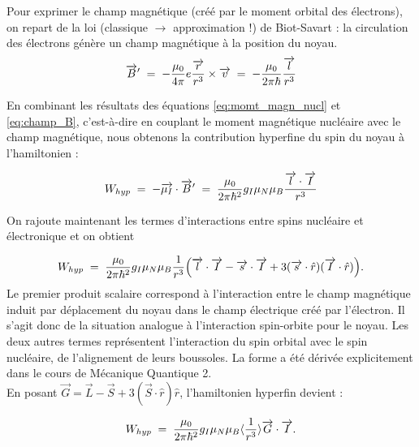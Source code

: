 Pour exprimer le champ magnétique (créé par le moment orbital des électrons), on repart de la loi (classique $\rightarrow$ approximation !) de Biot-Savart : la circulation des électrons génère un champ magnétique à la position du noyau.
\begin{equation}
    \overrightarrow{B}' \; = \;
    -\dfrac{\mu_0}{4\pi}e\dfrac{\overrightarrow{r}}{r^3}\times \overrightarrow{v} \; = \;
    -\dfrac{\mu_0}{2\pi\hbar}\dfrac{\overrightarrow{l}}{r^3}
    \label{eq:champ_B}
\end{equation}

En combinant les résultats des équations \eqref{eq:momt_magn_nucl} et \eqref{eq:champ_B}, c'est-à-dire en couplant le moment magnétique nucléaire avec le champ magnétique, nous obtenons la contribution hyperfine du spin du noyau à l'hamiltonien :

\begin{equation*}
    W_{hyp} \; = \; 
    - \overrightarrow{\mu_I} \cdot \overrightarrow{B}'
    \; = \;
    \dfrac{\mu_0}{2\pi\hbar^2} g_I \mu_N \mu_B \dfrac{\overrightarrow{l}\cdot\overrightarrow{I}}{r^3}
\end{equation*}

 On rajoute maintenant les termes d'interactions entre spins nucléaire et électronique et on obtient

\begin{equation}
    W_{hyp} \; = \;  \dfrac{\mu_0}{2\pi\hbar^2}g_I\mu_N\mu_B\dfrac{1}{r^3}\Big( \overrightarrow{l}\cdot\overrightarrow{I}-\overrightarrow{s}\cdot\overrightarrow{I} + 3(\overrightarrow{s}\cdot\hat{r})(\overrightarrow{I}\cdot\hat{r}) \Big).
\end{equation}
Le premier produit scalaire correspond à l'interaction entre le champ magnétique induit par déplacement du noyau dans le champ électrique créé par l'électron. Il s'agit donc de la situation analogue à l'interaction spin-orbite pour le noyau. Les deux autres termes représentent l'interaction du spin orbital avec le spin nucléaire, de l'alignement de leurs boussoles. La forme a été dérivée explicitement dans le cours de Mécanique Quantique 2.\\
En posant $\overrightarrow{G} = \overrightarrow{L} - \overrightarrow{S} + 3(\overrightarrow{S}\cdot\hat{r}) \hat{r}$, l'hamiltonien hyperfin devient :

\begin{equation}
     W_{hyp} \; = \;  \dfrac{\mu_0}{2\pi\hbar^2}g_I\mu_N\mu_B\langle\dfrac{1}{r^3}\rangle \overrightarrow{G}\cdot\overrightarrow{I}.
\end{equation}

